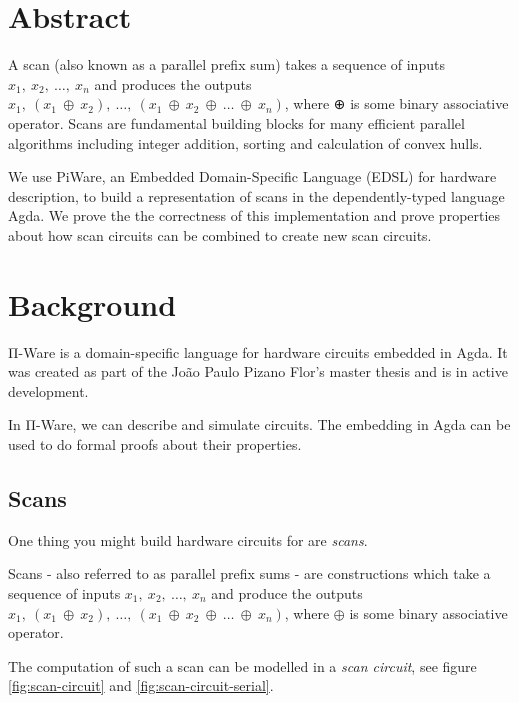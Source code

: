 \section{Abstract}\label{abstract}

A scan (also known as a parallel prefix sum) takes a sequence of inputs
\texorpdfstring{$x_1,\ x_2,\ \ldots{},\ x_n$}{x1, x2, ..., xn} and
produces the outputs \texorpdfstring{$x_1,\ (x_1\ \oplus\ x_2),\
  \ldots{},\ (x_1\ \oplus\ x_2\ \oplus\ \ldots{}\ \oplus\ x_n)$}
{x1, (x1 ⊕ x2), ..., (x1 ⊕ x2 ⊕ ... ⊕ xn)}, where ⊕ is some binary
associative operator.
Scans are fundamental building blocks for many efficient parallel
algorithms including integer addition, sorting and calculation of
convex hulls.

We use PiWare, an Embedded Domain-Specific Language (EDSL) for hardware
description, to build a representation of scans in the dependently-typed
language Agda. We prove the the correctness of this implementation and
prove properties about how scan circuits can be combined to create new
scan circuits.

\section{Background}\label{introduction}

Π-Ware is a domain-specific language for hardware circuits embedded in
Agda.
It was created as part of the João Paulo Pizano Flor's master thesis
and is in active development.

In Π-Ware, we can describe and simulate circuits.
The embedding in Agda can be used to do formal proofs about their
properties.

\subsection{Scans}\label{scans}

One thing you might build hardware circuits for are \emph{scans}.

Scans - also referred to as parallel prefix sums - are constructions
which take a sequence of inputs $x_1,\ x_2,\ \ldots{},\ x_n$ and
produce the outputs $x_1,\ (x_1\ \oplus\ x_2),\ \ldots{},\ (x_1\
\oplus\ x_2\ \oplus\ \ldots{}\ \oplus\ x_n)$, where $\oplus$ is some
binary associative operator.

The computation of such a scan can be modelled in a \emph{scan
  circuit}, see figure \ref{fig:scan-circuit} and
\ref{fig:scan-circuit-serial}.

